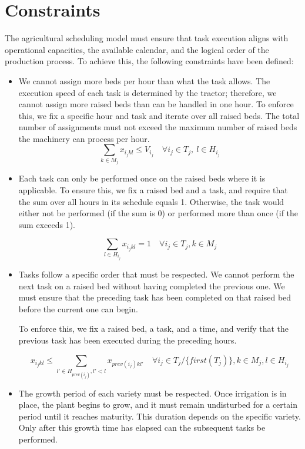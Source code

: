 \section*{Constraints}
The agricultural scheduling model must ensure that task execution aligns with operational capacities,  
the available calendar, and the logical order of the production process.  
To achieve this, the following constraints have been defined:
\begin{itemize}
    \item We cannot assign more beds per hour than what the task allows.  
    The execution speed of each task is determined by the tractor; therefore, we cannot assign more raised beds than can be handled in one hour.  
    To enforce this, we fix a specific hour and task and iterate over all raised beds.  
    The total number of assignments must not exceed the maximum number of raised beds the machinery can process per hour.
    \[
            \sum_{k\in M_j}x_{i_j kl} \leq V_{i_j} \quad \forall i_j \in T_j, \ l\in H_{i_j}
        \]
    \item Each task can only be performed once on the raised beds where it is applicable.  
        To ensure this, we fix a raised bed and a task, and require that the sum over all hours in its schedule equals 1.  
        Otherwise, the task would either not be performed (if the sum is 0) or performed more than once (if the sum exceeds 1).
        
        \[
	        \sum_{l\in H_{i_j}}x_{i_j kl} =1 \quad \forall i_j \in T_j , k \in M_j
        \]
    \item Tasks follow a specific order that must be respected.  
        We cannot perform the next task on a raised bed without having completed the previous one.  
        We must ensure that the preceding task has been completed on that raised bed before the current one can begin.
        
        To enforce this, we fix a raised bed, a task, and a time, and verify that the previous task has been executed during the preceding hours.
         
        \[
	        x_{i_j kl} \leq \sum_{l' \in H_{prev(i_j)}, l'<l}x_{prev(i_j)kl'} \quad \forall i_j\in T_j/\{first(T_j)\}, k\in M_j, l \in H_{i_j}
        \]
	
    \item The growth period of each variety must be respected. 
        Once irrigation is in place, the plant begins to grow,  
        and it must remain undisturbed for a certain period until it reaches maturity. This duration depends on the specific variety.  
        Only after this growth time has elapsed can the subsequent tasks be performed.
        

\end{itemize}
